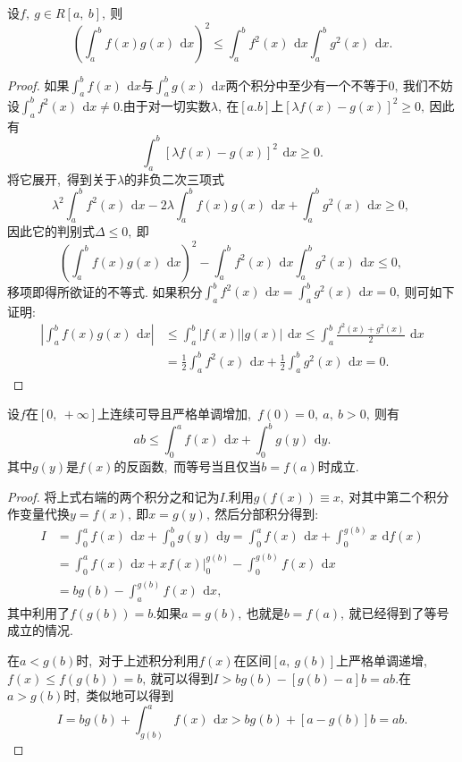 \begin{proposition}[Schwarz不等式]
	设$f,\ g\in R[a,\ b],\ $则
	$$\left(\int_{a}^{b}f(x)g(x)\,\ \text{d}x\right)^2\leqslant\int_{a}^{b}f^2(x)\,\ \text{d}x\int_{a}^{b}g^2(x)\,\ \text{d}x.$$
\end{proposition}
\begin{proof}
	如果$\int_{a}^{b}f(x)\,\ \text{d}x$与$\int_{a}^{b}g(x)\,\ \text{d}x$两个积分中至少有一个不等于$0,\ $我们不妨设$\int_{a}^{b}f^2(x)\,\ \text{d}x\neq 0.$由于对一切实数$\lambda,\ $在$[a.b]$上$[\lambda f(x)-g(x)]^2\geqslant 0,\ $因此有
	$$\int_{a}^{b}[\lambda f(x)-g(x)]^2\,\ \text{d}x\geqslant 0.$$
	将它展开,\ 得到关于$\lambda$的非负二次三项式
	$$\lambda^2\int_{a}^{b}f^2(x)\,\ \text{d}x-2\lambda\int_{a}^{b}f(x)g(x)\,\ \text{d}x+\int_{a}^{b}g^2(x)\,\ \text{d}x\geqslant 0,\ $$
	因此它的判别式$\Delta\leqslant 0,\ $即
	$$\left(\int_{a}^{b}f(x)g(x)\,\ \text{d}x\right)^2-\int_{a}^{b}f^2(x)\,\ \text{d}x\int_{a}^{b}g^2(x)\,\ \text{d}x\leqslant 0,\ $$
	移项即得所欲证的不等式.
	如果积分$\int_{a}^{b}f^2(x)\,\ \text{d}x=\int_{a}^{b}g^2(x)\,\ \text{d}x=0,\ $则可如下证明:
	\begin{align*}
		\left|\int_{a}^{b}f(x)g(x)\,\ \text{d}x\right|&\leqslant\int_{a}^{b}|f(x)||g(x)|\,\ \text{d}x\leqslant\int_{a}^{b}\frac{f^2(x)+g^2(x)}{2}\,\ \text{d}x\\
		&=\frac{1}{2}\int_{a}^{b}f^2(x)\,\ \text{d}x+\frac{1}{2}\int_{a}^{b}g^2(x)\,\ \text{d}x=0.
	\end{align*}
\end{proof}
\begin{proposition}[Young不等式]
	设$f$在$[0,\ +\infty]$上连续可导且严格单调增加,\ $f(0)=0,\ a,\ b>0,\ $则有
	$$ab\leqslant\int_{0}^{a}f(x)\,\ \text{d}x+\int_{0}^{b}g(y)\,\ \text{d}y.$$
	其中$g(y)$是$f(x)$的反函数,\ 而等号当且仅当$b=f(a)$时成立.
\end{proposition}
\begin{proof}
	将上式右端的两个积分之和记为$I.$利用$g(f(x))\equiv x,\ $对其中第二个积分作变量代换$y=f(x),\ $即$x=g(y),\ $然后分部积分得到:
	\begin{align*}
		I&=\int_{0}^{a}f(x)\,\ \text{d}x+\int_{0}^{b}g(y)\,\ \text{d}y=\int_{0}^{a}f(x)\,\ \text{d}x+\int_{0}^{g(b)}x\,\ \text{d}f(x)\\
		&=\int_{0}^{a}f(x)\,\ \text{d}x+xf(x)|_{0}^{g(b)}-\int_{0}^{g(b)}f(x)\,\ \text{d}x\\
		&=bg(b)-\int_{a}^{g(b)}f(x)\,\ \text{d}x,\ 
	\end{align*}
	其中利用了$f(g(b))=b.$如果$a=g(b),\ $也就是$b=f(a),\ $就已经得到了等号成立的情况.
	
	在$a<g(b)$时,\ 对于上述积分利用$f(x)$在区间$[a,\ g(b)]$上严格单调递增,\ $f(x)\leqslant f(g(b))=b,\ $就可以得到$I>bg(b)-[g(b)-a]b=ab.$在$a>g(b)$时,\ 类似地可以得到
	$$I=bg(b)+\int_{g(b)}^{a}f(x)\,\ \text{d}x>bg(b)+[a-g(b)]b=ab.$$
\end{proof}
